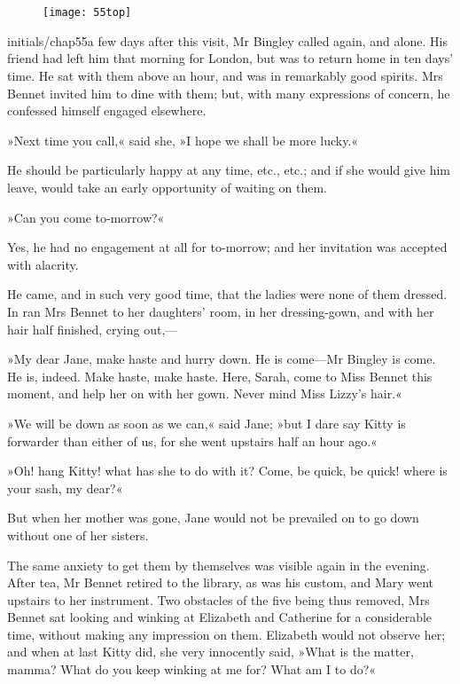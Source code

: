 \chapter[Chapter \thechapter]{}
	
	
\begin{figure}[t!]
\centering
\texttt{[image: 55top]}
\end{figure}


\lettrine[lines=6,image=true]{initials/chap55a}{} few days after this visit, Mr Bingley called again, and alone. His friend had left him that morning for London, but was to return home in ten days' time. He sat with them above an hour, and was in remarkably good spirits. Mrs Bennet invited him to dine with them; but, with many expressions of concern, he confessed himself engaged elsewhere.

»Next time you call,« said she, »I hope we shall be more lucky.«

He should be particularly happy at any time, etc., etc.; and if she would give him leave, would take an early opportunity of waiting on them.

»Can you come to-morrow?«

Yes, he had no engagement at all for to-morrow; and her invitation was accepted with alacrity.

He came, and in such very good time, that the ladies were none of them dressed. In ran Mrs Bennet to her daughters' room, in her dressing-gown, and with her hair half finished, crying out,—

»My dear Jane, make haste and hurry down. He is come—Mr Bingley is come. He is, indeed. Make haste, make haste. Here, Sarah, come to Miss Bennet this moment, and help her on with her gown. Never mind Miss Lizzy's hair.«

»We will be down as soon as we can,« said Jane; »but I dare say Kitty is forwarder than either of us, for she went upstairs half an hour ago.«

»Oh! hang Kitty! what has she to do with it? Come, be quick, be quick! where is your sash, my dear?«

But when her mother was gone, Jane would not be prevailed on to go down without one of her sisters.

The same anxiety to get them by themselves was visible again in the evening. After tea, Mr Bennet retired to the library, as was his custom, and Mary went upstairs to her instrument. Two obstacles of the five being thus removed, Mrs Bennet sat looking and winking at Elizabeth and Catherine for a considerable time, without making any impression on them. Elizabeth would not observe her; and when at last Kitty did, she very innocently said, »What is the matter, mamma? What do you keep winking at me for? What am I to do?«


